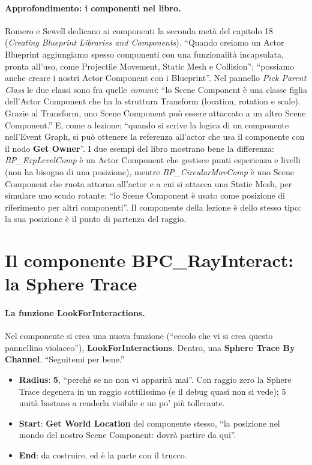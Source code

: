 \paragraph{Approfondimento: i componenti nel libro.} Romero e Sewell dedicano ai componenti
la seconda metà del capitolo 18 (\emph{Creating Blueprint Libraries and Components}).
``Quando creiamo un Actor Blueprint aggiungiamo spesso componenti con una funzionalità
incapsulata, pronta all'uso, come Projectile Movement, Static Mesh e Collision''; ``possiamo
anche creare i nostri Actor Component con i Blueprint''. Nel pannello \emph{Pick Parent
Class} le due classi sono fra quelle \emph{comuni}: ``lo Scene Component è una classe figlia
dell'Actor Component che ha la struttura Transform (location, rotation e scale). Grazie al
Transform, uno Scene Component può essere attaccato a un altro Scene Component.'' E, come a
lezione: ``quando si scrive la logica di un componente nell'Event Graph, si può ottenere la
referenza all'actor che usa il componente con il nodo \textbf{Get Owner}''. I due esempi del
libro mostrano bene la differenza: \emph{BP\_ExpLevelComp} è un Actor Component che gestisce
punti esperienza e livelli (non ha bisogno di una posizione), mentre \emph{BP\_CircularMovComp}
è uno Scene Component che ruota attorno all'actor e a cui si attacca una Static Mesh, per
simulare uno scudo rotante: ``lo Scene Component è usato come posizione di riferimento per
altri componenti''. Il componente della lezione è dello stesso tipo: la sua posizione è il
punto di partenza del raggio.

\section{Il componente BPC\_RayInteract: la Sphere Trace}
\label{ue12:sec:componente}

\paragraph{La funzione LookForInteractions.} Nel componente si crea una nuova funzione
(``eccolo che vi si crea questo pannellino violaceo''), \textbf{LookForInteractions}.
Dentro, una \textbf{Sphere Trace By Channel}. ``Seguitemi per bene.''
\begin{itemize}
  \item \textbf{Radius}: \textbf{5}, ``perché se no non vi apparirà mai''. Con raggio zero
        la Sphere Trace degenera in un raggio sottilissimo (e il debug quasi non si vede);
        5 unità bastano a renderla visibile e un po' più tollerante.
  \item \textbf{Start}: \textbf{Get World Location} del componente stesso, ``la posizione
        nel mondo del nostro Scene Component: dovrà partire da qui''.
  \item \textbf{End}: da costruire, ed è la parte con il trucco.
\end{itemize}

